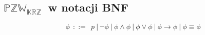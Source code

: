 \documentclass[12pt]{article}
\newtheorem{definicja}{Definicja}
\newcommand {\PZWKRZ} {\ensuremath{\mathbb{PZW_{KRZ}}}}
\begin{document}
%
%
%
%

\subsection{\PZWKRZ\ w notacji BNF}
%
\begin{equation}
\phi ~~::=~~ p ~|~ \neg \phi ~|~ \phi \land \phi ~|~ \phi \lor \phi ~|~ \phi \to \phi ~|~ \phi \equiv \phi
\end{equation}
%
\end{document}

